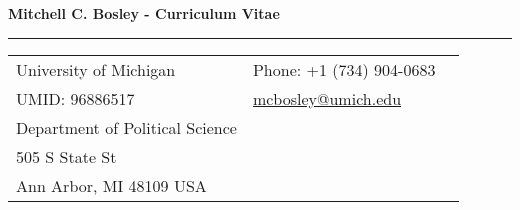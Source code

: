 \documentclass[letterpaper,11pt,oneside]{article}
\begin{document}

\noindent  \LARGE{\textbf{Mitchell C. Bosley - Curriculum Vitae}}  \\
\vspace{-2ex}
\hrule
\normalsize


\bigskip
\noindent \begin{tabular}{@{} l l l}
 University of Michigan & \hspace{1in} Phone: +1 (734) 904-0683\\
 UMID: 96886517 & \hspace{1in} \href{mailto:mcbosley@umich.edu}{mcbosley@umich.edu} \\
 Department of Political Science &  \\  
 505 S State St & \\ 
 Ann Arbor, MI 48109 USA & \\
\end{tabular}


\vspace{1em}
\end{document}
